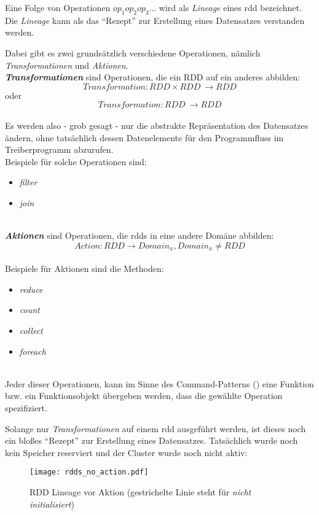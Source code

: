 Eine Folge von Operationen $op_1op_2op_3...$ wird als \textit{Lineage} eines \gls{rdd} bezeichnet. Die \textit{Lineage} kann als das "`Rezept"' zur Erstellung eines Datensatzes verstanden werden.

Dabei gibt es zwei grundsätzlich verschiedene Operationen, nämlich \textit{Transformationen} und \textit{Aktionen}.\\

\textbf{\textit{Transformationen}} sind Operationen, die ein \gls{RDD} auf ein anderes abbilden:\\
\[Transformation: RDD \times RDD\ \longrightarrow RDD\]
oder
\[Transformation: RDD\ \longrightarrow RDD\]
\\
Es werden also - grob gesagt - nur die abstrakte Repräsentation des Datensatzes ändern, ohne tatsächlich dessen Datenelemente für den Programmfluss im Treiberprogramm abzurufen.\\
Beispiele für solche Operationen sind:
\begin{itemize}
	\item \textit{filter}
	\item \textit{join}
\end{itemize}\\

\textbf{\textit{Aktionen}} sind Operationen, die \glspl{rdd} in eine andere Domäne abbilden:\\
\[Action: RDD \longrightarrow Domain_x, Domain_x \neq RDD\]
\\
Beispiele für Aktionen sind die Methoden:
\begin{itemize}
	\item \textit{reduce}
	\item \textit{count}
	\item \textit{collect}
	\item \textit{foreach}
\end{itemize}\\

Jeder dieser Operationen, kann im Sinne des Command-Patterns (\cite{FPP13}) eine Funktion bzw. ein Funktionsobjekt übergeben werden, dass die gewählte Operation spezifiziert.

Solange nur \textit{Transformationen} auf einem \gls{rdd} ausgeführt werden, ist dieses noch ein bloßes "`Rezept"' zur Erstellung eines Datensatzes. Tatsächlich wurde noch kein Speicher reserviert und der Cluster wurde noch nicht aktiv\cite{Mat12}:\\

\begin{figure}[ht!]
	\centering
  \texttt{[image: rdds\_no\_action.pdf]}
	\caption{RDD Lineage vor Aktion (gestrichelte Linie steht für \textit{nicht initialisiert})}
	\label{fig:rdds_no_action}
\end{figure}

